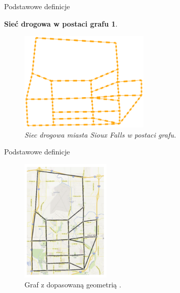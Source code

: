 \documentclass{beamer}
\begin{document}
\begin{frame}{Podstawowe definicje} 

\newtheorem{mydef2}{Sieć drogowa w postaci grafu}
\begin{mydef2}
	\begin{figure}[h!]
	\includegraphics[width=0.55\textwidth]{img/graf}
	\caption{Siec drogowa miasta Sioux Falls w postaci grafu.} 
	\end{figure}
\end{mydef2}

\end{frame}

\begin{frame}{Podstawowe definicje} 
	\begin{figure}[h!]
	\includegraphics[width=0.38\textwidth]{img/dopasowanie}
	\caption{Graf z dopasowaną geometrią \cite{siux}.}
	\end{figure}
\end{frame}
\end{document}
